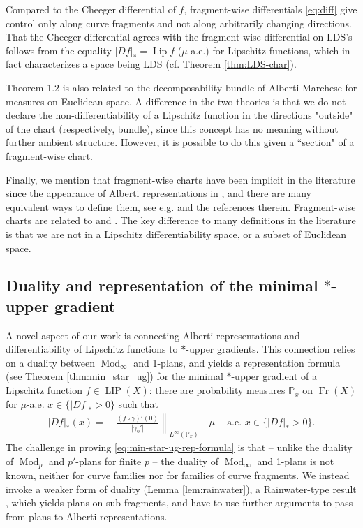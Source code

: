 \documentclass{amsart}
\numberwithin{equation}{section}
\renewcommand{\P}{\mathbb{P}}
\newcommand{\Mod}{\operatorname{Mod}}
\newcommand{\Lip}{\operatorname{Lip}}
\newcommand{\LIP}{\operatorname{LIP}}
\newcommand{\Fr}{\operatorname{Fr}}
\begin{document}
Compared to the Cheeger differential of $f$, fragment-wise differentials \eqref{eq:diff} give control only along curve fragments and not along arbitrarily changing directions. That the Cheeger differential agrees with the fragment-wise differential on LDS's follows from the equality $|Df|_\ast=\Lip f$ ($\mu$-a.e.) for Lipschitz functions, which in fact characterizes a space being LDS (cf. Theorem \ref{thm:LDS-char}). 

Theorem 1.2 is also related to the decomposability bundle of Alberti-Marchese \cite{almar16} for measures on Euclidean space. A difference in the two theories is that we do not declare the non-differentiability of a Lipschitz function in the directions "outside" of the chart (respectively, bundle), since this concept has no meaning without further ambient structure. However, it is possible to do this given a ``section" of a fragment-wise chart.

Finally, we mention that fragment-wise charts have been implicit in the literature since the appearance of Alberti representations in \cite{bate15}, and there are many equivalent ways to define them, see e.g. \cite{sch16b,bate15} and the references therein. Fragment-wise charts are related to \cite[Theorem 2.1]{batepure} and \cite[Theorem 1.6 and 1.7]{schulli}. The key difference to many definitions in the literature is that we are not in a Lipschitz differentiability space, or a subset of Euclidean space. 

\subsection{Duality and representation of the minimal $\ast$-upper gradient}\label{sec:duality} A novel aspect of our work is connecting Alberti representations and differentiability of Lipschitz functions to $\ast$-upper gradients. This connection relies on a duality between $\Mod_\infty$ and 1-plans, and yields a representation formula (see Theorem \ref{thm:min_star_ug}) for the minimal $\ast$-upper gradient of a Lipschitz function $f\in \LIP(X)$: there are probability measures $\P_x$ on $\Fr(X)$ for $\mu$-a.e. $x\in \{|Df|_\ast>0\}$ such that
\begin{align}\label{eq:min-star-ug-rep-formula}
|Df|_{\ast}(x)=\left\|\frac{(f\circ\gamma)'(0)}{|\gamma_0'|}\right\|_{L^\infty(\P_x)}\quad \mu-\textrm{a.e. }x\in \{|Df|_\ast>0\}.
\end{align}
The challenge in proving \eqref{eq:min-star-ug-rep-formula} is that -- unlike the duality of $\Mod_p$ and $p'$-plans for finite $p$ \cite{amb13}-- the duality of $\Mod_\infty$ and 1-plans is not known, neither for curve families nor for families of curve fragments. We instead invoke a weaker form of duality (Lemma \ref{lem:rainwater}), a Rainwater-type result \cite{almar16,bate15,sch16b}, which yields plans on sub-fragments, and have to use further arguments to pass from plans to Alberti representations.
\end{document}
